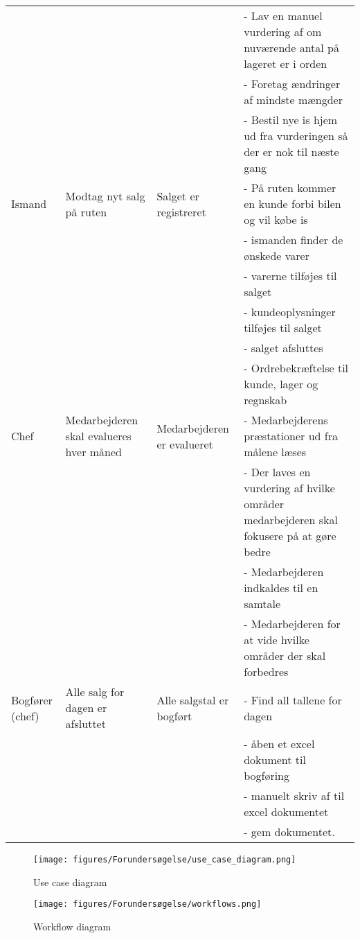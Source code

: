 \begin{center}
\begin{longtable}{ |p{90pt}|p{90pt}|p{90pt}|p{90pt}| }
    &&&
    - Lav en manuel vurdering af om nuværende antal på lageret er i orden \\
    &&&
    - Foretag ændringer af mindste mængder \\
    &&&
    - Bestil nye is hjem ud fra vurderingen så der er nok til næste gang \\
    \hline
    Ismand & Modtag nyt salg på ruten & Salget er registreret & 
    - På ruten kommer en kunde forbi bilen og vil købe is \\
    &&&
    - ismanden finder de ønskede varer \\
    &&&
    - varerne tilføjes til salget \\
    &&&
    - kundeoplysninger tilføjes til salget \\
    &&&
    - salget afsluttes \\
    &&&
    - Ordrebekræftelse til kunde, lager og regnskab \\
    \hline
    Chef & Medarbejderen skal evalueres hver måned &Medarbejderen er evalueret &
    - Medarbejderens præstationer ud fra målene læses \\
    &&&
    - Der laves en vurdering af hvilke områder medarbejderen skal fokusere på at gøre bedre \\
    &&&
    - Medarbejderen indkaldes til en samtale \\
    &&&
    - Medarbejderen for at vide hvilke områder der skal forbedres \\
    \hline
    Bogfører (chef) & Alle salg for dagen er afsluttet & Alle salgstal er bogført & 
    - Find all tallene for dagen \\
    &&&
    - åben et excel dokument til bogføring \\
    &&&
    - manuelt skriv af til excel dokumentet \\
    &&&
    - gem dokumentet. \\
    \hline
\end{longtable}
\end{center}

\begin{figure}[H]
    \centering
    \texttt{[image: figures/Forundersøgelse/use\_case\_diagram.png]}
    \caption{Use case diagram}
    \label{fig:use_case_diagram}
\end{figure}

\begin{figure}[H]
    \centering
    \texttt{[image: figures/Forundersøgelse/workflows.png]}
    \caption{Workflow diagram}
    \label{fig:workflows}
\end{figure}